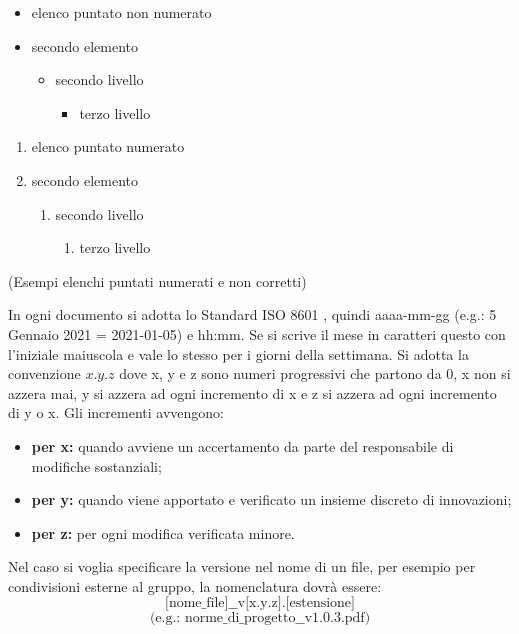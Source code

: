         \begin{multicols}{2}
            \begin{itemize}
                \item elenco puntato non numerato
                \item secondo elemento
                \begin{itemize}
                    \item secondo livello
                    \begin{itemize}
                        \item terzo livello
                    \end{itemize}
                \end{itemize}
            \end{itemize}
            \begin{enumerate}
                \item elenco puntato numerato
                \item secondo elemento
                \begin{enumerate}
                    \item secondo livello
                    \begin{enumerate}
                        \item terzo livello
                    \end{enumerate}
                \end{enumerate}
            \end{enumerate}
        \end{multicols}
        \centerline{(Esempi elenchi puntati numerati e non corretti)}
        In ogni documento si adotta lo Standard ISO 8601 , quindi aaaa-mm-gg (e.g.: 5 Gennaio 2021 = 2021-01-05) e hh:mm. Se si scrive il mese in caratteri questo con l'iniziale maiuscola e vale lo stesso per i giorni della settimana.
        \label{versions}
        Si adotta la convenzione $x.y.z$ dove x, y e z sono numeri progressivi che partono da 0, x non si azzera mai, y si azzera ad ogni incremento di x e z si azzera ad ogni incremento di y o x. Gli incrementi avvengono:
        \begin{itemize}
            \item \textbf{per x: }quando avviene un accertamento da parte del responsabile di modifiche sostanziali;
            \item \textbf{per y: }quando viene apportato e verificato un insieme discreto di innovazioni;
            \item \textbf{per z: }per ogni modifica verificata minore.
        \end{itemize}
        Nel caso si voglia specificare la versione nel nome di un file, per esempio per condivisioni esterne al gruppo, la nomenclatura dovrà essere: $$\text{[nome\_file]\_\_v[x.y.z].[estensione]}$$ $$\text{(e.g.: norme\_di\_progetto\_\_v1.0.3.pdf)}$$


